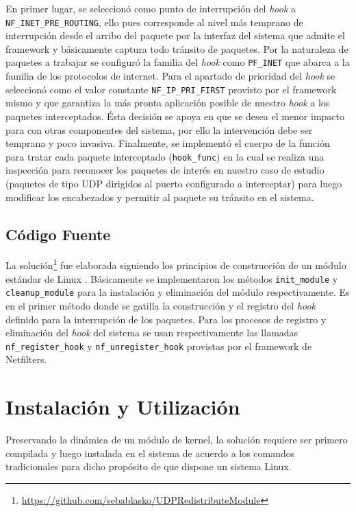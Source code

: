 En primer lugar, se seleccionó como punto de interrupción del \emph{hook} a \verb=NF_INET_PRE_ROUTING=, ello pues corresponde al nivel más temprano de interrupción desde el arribo del paquete por la interfaz del sistema que admite el framework y básicamente captura todo tránsito de paquetes. Por la naturaleza de paquetes a trabajar se configuró la familia del \emph{hook} como \verb=PF_INET= que abarca a la familia de los protocolos de internet. Para el apartado de prioridad del \emph{hook} se seleccionó como el valor constante \verb=NF_IP_PRI_FIRST= provisto por el framework mismo y que garantiza la más pronta aplicación posible de nuestro \emph{hook} a los paquetes interceptados. Ésta decisión se apoya en que se desea el menor impacto para con otras componentes del sistema, por ello la intervención debe ser temprana y poco invasiva. Finalmente, se implementó el cuerpo de la función para tratar cada paquete interceptado (\verb=hook_func=) en la cual se realiza una inspección para reconocer los paquetes de interés en nuestro caso de estudio (paquetes de tipo UDP dirigidos al puerto configurado a interceptar) para luego modificar los encabezados y permitir al paquete su tránsito en el sistema.

\subsection{Código Fuente}
La solución\footnote{\url{https://github.com/sebablasko/UDPRedistributeModule}} fue elaborada siguiendo los principios de construcción de un módulo estándar de Linux \cite{report:netfilterModule}. Básicamente se implementaron los métodos \verb=init_module= y \verb=cleanup_module= para la instalación y eliminación del módulo respectivamente. Es en el primer método donde se gatilla la construcción y el registro del \emph{hook} definido para la interrupción de los paquetes. Para los procesos de registro y eliminación del \emph{hook} del sistema se usan respectivamente las llamadas \verb=nf_register_hook= y \verb=nf_unregister_hook= provistas por el framework de Netfilters.

\section{Instalación y Utilización}
Preservando la dinámica de un módulo de kernel, la solución requiere ser primero compilada y luego instalada en el sistema de acuerdo a los comandos tradicionales para dicho propósito de que dispone un sistema Linux.

